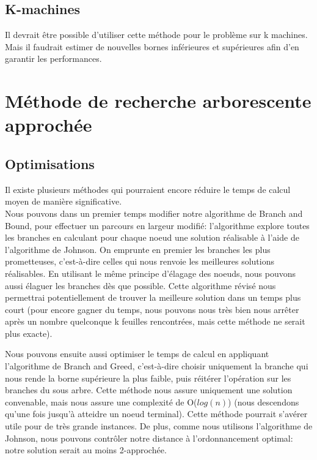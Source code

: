 \documentclass[12pt]{article}
\begin{document}
\subsection{K-machines}

Il devrait être possible d'utiliser cette méthode pour le problème sur k machines. Mais il faudrait estimer de nouvelles bornes inférieures et supérieures afin d'en garantir les performances.


\clearpage
\newpage
\section{Méthode de recherche arborescente approchée}

\subsection{Optimisations}

Il existe plusieurs méthodes qui pourraient encore réduire le temps de calcul moyen de manière significative.\\

Nous pouvons dans un premier temps modifier notre algorithme de Branch and Bound, pour effectuer un parcours en largeur modifié: l'algorithme explore toutes les branches en calculant pour chaque noeud une solution réalisable à l'aide de l'algorithme de Johnson. On emprunte en premier les branches les plus prometteuses, c'est-à-dire celles qui nous renvoie les meilleures solutions réalisables. En utilisant le même principe d'élagage des noeuds, nous pouvons aussi élaguer les branches dès que possible. Cette algorithme révisé nous permettrai potentiellement de trouver la meilleure solution dans un temps plus court (pour encore gagner du temps, nous pouvons nous très bien nous arrêter après un nombre quelconque k feuilles rencontrées, mais cette méthode ne serait plus exacte).

Nous pouvons ensuite aussi optimiser le temps de calcul en appliquant l'algorithme de Branch and Greed, c'est-à-dire choisir uniquement la branche qui nous rende la borne supérieure la plus faible, puis réitérer l'opération sur les branches du sous arbre. Cette méthode nous assure uniquement une solution convenable, mais nous assure une complexité de O($log(n)$) (nous descendons qu'une fois jusqu'à atteidre un noeud terminal). Cette méthode pourrait s'avérer utile pour de très grande instances. De plus, comme nous utilisons l'algorithme de Johnson, nous pouvons contrôler notre distance à l'ordonnancement optimal: notre solution serait au moins 2-approchée.
\end{document}
